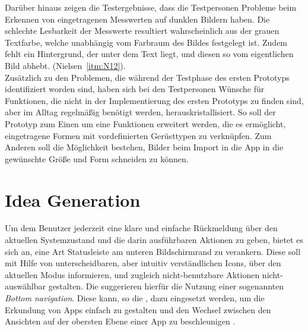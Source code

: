 Darüber hinaus zeigen die Testergebnisse, dass die Testpersonen Probleme beim Erkennen von eingetragenen Messwerten auf dunklen Bildern haben.
Die schlechte Lesbarkeit der Messwerte resultiert wahrscheinlich aus der grauen Textfarbe, welche unabhängig vom Farbraum des Bildes festgelegt ist.
Zudem fehlt ein Hintergrund, der unter dem Text liegt, und diesen so vom eigentlichen Bild abhebt.
(Nielsen~\autoref{itm:N12}). \\

Zusätzlich zu den Problemen, die während der Testphase des ersten Prototyps identifiziert worden sind, haben sich bei den Testpersonen Wünsche für Funktionen, die nicht in der Implementierung des ersten Prototyps zu finden sind, aber im Alltag regelmäßig benötigt werden, herauskristallisiert. 
So soll der Prototyp zum Einen um eine Funktionen erweitert werden, die es ermöglicht, eingetragene Formen mit vordefinierten Gerüsttypen zu verknüpfen.
Zum Anderen soll die Möglichkeit bestehen, Bilder beim Import in die App in die gewünschte Größe und Form schneiden zu können.

\section{Idea Generation}\label{sec:idea2}
Um dem Benutzer jederzeit eine klare und einfache Rückmeldung über den aktuellen Systemzustand und die darin ausführbaren Aktionen zu geben, bietet es sich an, eine Art Statusleiste am unteren Bildschirmrand zu verankern.
Diese soll mit Hilfe von unterscheidbaren, aber intuitiv verständlichen Icons, über den aktuellen Modus informieren, und zugleich nicht-benutzbare Aktionen nicht-auswählbar gestalten.
Die \mg{} suggerieren hierfür die Nutzung einer sogenannten \emph{Bottom navigation}.
Diese kann, so die \mg{}, dazu eingesetzt werden, um die Erkundung von Apps einfach zu gestalten und den Wechsel zwischen den Ansichten auf der obersten Ebene einer App zu beschleunigen \citep{BN18}. \\

